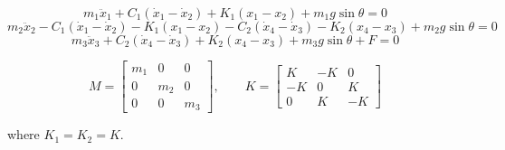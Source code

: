 \begin{equation*}
m_{1}\ddot{x}_{1}+C_{1}(\dot{x}_{1}-\dot{x}_{2})+K_{1}(x_{1}-x_{2})+m_{1}g\sin\theta=0
\end{equation*}
\begin{equation*}
m_{2}\ddot{x}_{2}-C_{1}(\dot{x}_{1}-\dot{x}_{2})-K_{1}(x_{1}-x_{2})-C_{2}(\dot{x}_{4}-\dot{x}_{3})-K_{2}(x_{4}-x_{3})+m_{2}g\sin\theta=0
\end{equation*}
\begin{equation}\tag{C-1}
m_{3}\ddot{x}_{3}+C_{2}(\dot{x}_{4}-\dot{x}_{3})+K_{2}(x_{4}-x_{3})+m_{3}g\sin\theta +F=0
\end{equation}
\begin{center}
\begin{equation}\tag{C-2}
M=
  \begin{bmatrix}
    m_{1} & 0 & 0 \\
    0&m_{2} & 0\\
    0&0&m_{3}
  \end{bmatrix}
  ,\quad\quad
  K=
  \begin{bmatrix}
   K &-K & 0 \\
    -K&0&K\\
    0&K&-K
  \end{bmatrix}
\end{equation}
\end{center}
where $K_{1}=K_{2}=K$.

